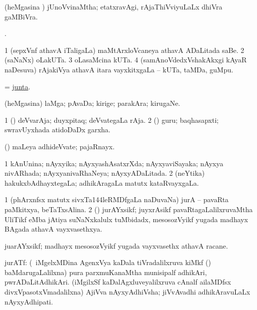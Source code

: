 \bentry
{}
\gl{\gu}
\bmng
(heMgasina \vi) jUnoVvinaMtha; etatxravAgi, rAjaThiVviyuLaLx dhiVra gaMBiVra. 
\emng
\eentry

\bentry
{}
\gl{\saMkiSx}
\bmng
{}. 
\emng
\eentry

\bentry
{}
\gl{\nA}
\bmng
\bnum
\num{1} (sepxVnf athavA iTaligaLa) maMtArxloVcaneya athavA ADaLitada saBe. 
\num{2} (saNaNx) oLakUTa. 
\num{3} oLasaMcina kUTa. 
\num{4} (samAnoVdedxVshakAkxgi kAyaR naDesuva) rAjakiVya athavA itara vayxkitxgaLa -- kUTa, taMDa, guMpu. 
\enum
\emng
\eentry

\bentry
{}
\gl{\nA}
\bmng
 = \hyperlink{junta}{junta}. 
\emng
\eentry

\bentry
{}
\gl{\nA}
\expl{\F}
\bmng
(heMgasina) laMga; pAvaDa; kirige; parakAra; kirugaNe. 
\emng
\eentry

\bentry
{}
\gl{\nA}
\bmng
\bnum
\num{1} (\roVpu) deVvarAja; duyxpitaq; deVvategaLa rAja. 
\num{2} (\Kavi) guru; baqhasapxti; swravUyxhada atidoDaDx garxha. 
\enum
\emng

\noindent
\gl{\pagu}
\bmng
{} (\hA) maLeya adhideVvate; pajaRnayx. 
\emng
\eentry

\bentry
{}
\gl{\gu}
\bmng
\bnum
\num{1} kAnUnina; nAyxyika; nAyxyashAsatxrXda; nAyxyaviSayaka; nAyxya nivARhada; nAyxyanivaRhaNeya; nAyxyADaLitada. 
\num{2} (neYtika) hakukxbAdhayxtegaLa; adhikAragaLa matutx kataRvayxgaLa. 
\enum
\emng
\eentry

\bentry
{}
\gl{\gu}
\bmng
\bnum
\num{1} (phArxnfsx matutx sivxTa\char144leRMDfgaLa naDuvaNa) jurA -- pavaRta paMkitxya, beTaTxsAlina. 
\num{2} (\BUvi) jurAYxsikf; juyxrAsikf pavaRtagaLalilxruvaMtha UliTikf eMba jAtiya suNaNxkalulx tuMbidadx, mesosozVyikf yugada madhayx BAgada athavA vayxvasethxya. 
\enum
\emng
\eentry

\bentry
{}
\gl{\nA}
\bmng
juarAYxsikf; madhayx mesosozVyikf yugada vayxvasethx athavA racane. 
\emng
\eentry

\bentry
{}
\gl{\nA}
\bmng
jurATf: 
\banum
{} (\kanmu\ iMgelxMDina AgenxVya kaDala tiVradalilxruva kiMkf () baMdarugaLalilxna) pura parxmuKanaMtha munisipalf adhikAri, pwrADaLitAdhikAri. 
 (iMgilxSf kaDalAgxluveyalilxruva cAnalf ailaMDfsx divxVpasotxVmadalilxna) AjiVva nAyxyAdhiVsha; jiVvAvadhi adhikAravuLaLx nAyxyAdhipati. 
\eanum
\emng
\eentry

